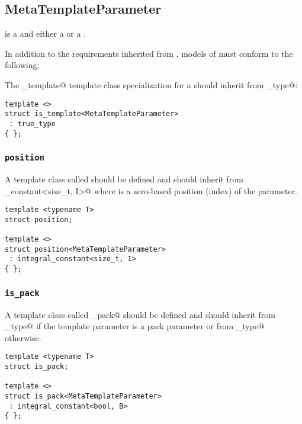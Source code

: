 \subsection{MetaTemplateParameter}
\label{concept-MetaTemplateParameter}



 is a  and either a  or a .

In addition to the requirements inherited from ,
models of  must conform to the following:

The \verb@is_template@ template class specialization for a  should
inherit from \verb@true_type@:

\begin{verbatim}
template <>
struct is_template<MetaTemplateParameter>
 : true_type
{ };
\end{verbatim}

\subsubsection{\texttt{position}}

A template class called \verb@position@ should be defined and should
inherit from \verb@integral_constant<size_t, I>@ where \verb@I@ is
a zero-based position (index) of the parameter.

\begin{verbatim}
template <typename T>
struct position;

template <>
struct position<MetaTemplateParameter>
 : integral_constant<size_t, I>
{ };
\end{verbatim}

\subsubsection{\texttt{is\_pack}}

A template class called \verb@is_pack@ should be defined and should
inherit from \verb@true_type@ if the template parameter is a pack
parameter or from \verb@false_type@ otherwise.

\begin{verbatim}
template <typename T>
struct is_pack;

template <>
struct is_pack<MetaTemplateParameter>
 : integral_constant<bool, B>
{ };
\end{verbatim}

